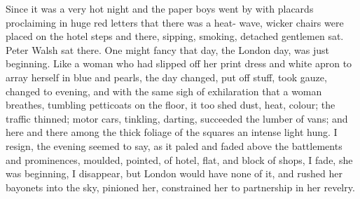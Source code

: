 \documentclass[lang=cn,10pt]{elegantbook}
\begin{document}
Since it was a very hot night and the paper boys went by with
placards proclaiming in huge red letters that there was a heat-
wave, wicker chairs were placed on the hotel steps and there,
sipping, smoking, detached gentlemen sat.  Peter Walsh sat there.
One might fancy that day, the London day, was just beginning.  Like
a woman who had slipped off her print dress and white apron to
array herself in blue and pearls, the day changed, put off stuff,
took gauze, changed to evening, and with the same sigh of
exhilaration that a woman breathes, tumbling petticoats on the
floor, it too shed dust, heat, colour; the traffic thinned; motor
cars, tinkling, darting, succeeded the lumber of vans; and here and
there among the thick foliage of the squares an intense light hung.
I resign, the evening seemed to say, as it paled and faded above
the battlements and prominences, moulded, pointed, of hotel, flat,
and block of shops, I fade, she was beginning, I disappear, but
London would have none of it, and rushed her bayonets into the sky,
pinioned her, constrained her to partnership in her revelry.
\end{document}
